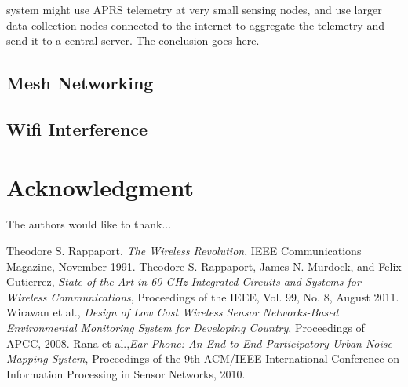 \documentclass[conference]{IEEEtran}
\begin{document}
system might use APRS telemetry at very small sensing nodes, and use larger
data collection nodes connected to the internet to aggregate the telemetry
and send it to a central server.
The conclusion goes here.
\subsection{Mesh Networking}
\subsection{Wifi Interference}






\section*{Acknowledgment}


The authors would like to thank...







%
%
%
\begin{thebibliography}{1}

Theodore S. Rappaport, \emph{The Wireless Revolution}, IEEE Communications Magazine, November 1991.
Theodore S. Rappaport, James N. Murdock, and Felix Gutierrez, \emph{State of the Art in 60-GHz Integrated Circuits and Systems for Wireless Communications}, Proceedings of the IEEE, Vol. 99, No. 8, August 2011.
Wirawan et al., \emph{Design of Low Cost Wireless Sensor Networks-Based Environmental Monitoring System for Developing Country}, Proceedings of APCC, 2008.
Rana et al.,\emph{Ear-Phone: An End-to-End Participatory Urban Noise Mapping System}, Proceedings of the 9th ACM/IEEE International Conference on Information Processing in Sensor Networks, 2010.
\end{thebibliography}




\end{document}

